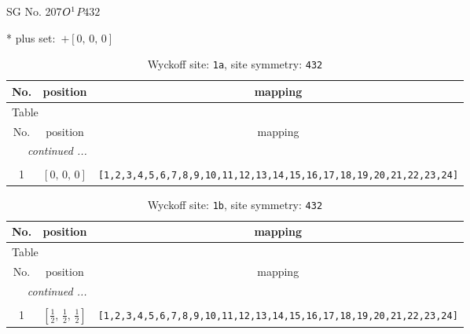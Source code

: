 \documentclass[fleqn,8pt]{jsarticle}
\begin{document}
\setcounter{MaxMatrixCols}{32}

\renewcommand{\tablename}{Table~}
\renewcommand{\figurename}{Figure~}
\begin{center}
\LARGE
SG No. 207\quad$O_{\rm }^{1}$\quad$P432$\quad[ cubic ]
\end{center}
* plus set:\,\,\,$+\left[ 0,\, 0,\, 0 \right]$
\renewcommand{\arraystretch}{1.2}
\begin{longtable}{ccc}
\caption{Wyckoff site: {\tt 1a}, site symmetry: {\tt 432}}
 \\
 \hline \hline
No. & position & mapping \\ \hline \endfirsthead

\multicolumn{2}{l}{\tablename\ \thetable{}} \\
 \hline \hline
No. & position & mapping \\ \hline \endhead

 \hline \hline
\multicolumn{2}{r}{\footnotesize\it continued ...} \\ \endfoot

 \hline \hline
\multicolumn{2}{r}{} \\ \endlastfoot

1 & $\left[ 0,\, 0,\, 0 \right]$ & {\tt [1,2,3,4,5,6,7,8,9,10,11,12,13,14,15,16,17,18,19,20,21,22,23,24]} \\
\end{longtable}
\renewcommand{\arraystretch}{1.2}
\begin{longtable}{ccc}
\caption{Wyckoff site: {\tt 1b}, site symmetry: {\tt 432}}
 \\
 \hline \hline
No. & position & mapping \\ \hline \endfirsthead

\multicolumn{2}{l}{\tablename\ \thetable{}} \\
 \hline \hline
No. & position & mapping \\ \hline \endhead

 \hline \hline
\multicolumn{2}{r}{\footnotesize\it continued ...} \\ \endfoot

 \hline \hline
\multicolumn{2}{r}{} \\ \endlastfoot

1 & $\left[ \frac{1}{2},\, \frac{1}{2},\, \frac{1}{2} \right]$ & {\tt [1,2,3,4,5,6,7,8,9,10,11,12,13,14,15,16,17,18,19,20,21,22,23,24]} \\
\end{longtable}
\renewcommand{\arraystretch}{1.2}
\end{document}
